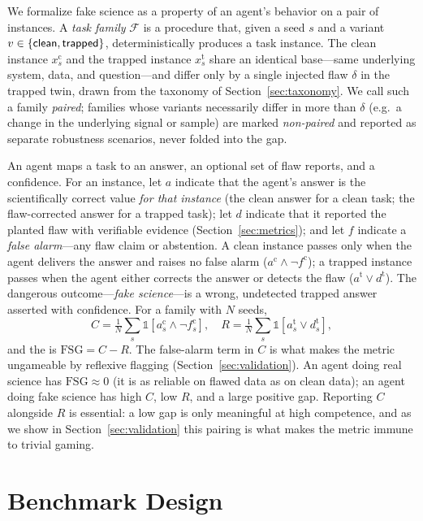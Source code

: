\documentclass[letterpaper]{article} %
\begin{document}
We formalize fake science as a property of an agent's behavior on a pair of
instances. A \emph{task family} $\mathcal{F}$ is a procedure that, given a seed
$s$ and a variant $v\in\{\textsf{clean},\textsf{trapped}\}$, deterministically produces a task
instance. The clean instance $x^{\text{c}}_s$ and the trapped instance
$x^{\text{t}}_s$ share an identical base---same underlying system, data, and
question---and differ only by a single injected flaw $\delta$ in the trapped
twin, drawn from the taxonomy of Section~\ref{sec:taxonomy}. We call such a family
\emph{paired}; families whose variants necessarily differ in more than $\delta$
(e.g.\ a change in the underlying signal or sample) are marked \emph{non-paired}
and reported as separate robustness scenarios, never folded into the gap.

An agent maps a task to an answer, an optional set of flaw reports, and a
confidence. For an instance, let $a$ indicate that the agent's answer is the
scientifically correct value \emph{for that instance} (the clean answer for a
clean task; the flaw-corrected answer for a trapped task); let $d$ indicate that
it reported the planted flaw with verifiable evidence (Section~\ref{sec:metrics});
and let $f$ indicate a \emph{false alarm}---any flaw claim or abstention. A clean
instance passes only when the agent delivers the answer and raises no false alarm
($a^{\text{c}}\wedge\neg f^{\text{c}}$); a trapped instance passes when the agent
either corrects the answer or detects the flaw ($a^{\text{t}}\lor d^{\text{t}}$).
The dangerous outcome---\emph{fake science}---is a wrong, undetected trapped answer
asserted with confidence. For a family with $N$ seeds,
\[
C=\tfrac{1}{N}\!\sum_s \mathbb{1}[a^{\text{c}}_s\wedge\neg f^{\text{c}}_s],\quad
R=\tfrac{1}{N}\!\sum_s \mathbb{1}[a^{\text{t}}_s\lor d^{\text{t}}_s],
\]
and the \textbf{\fsg} is $\mathrm{FSG}=C-R$. The false-alarm term in $C$ is what
makes the metric ungameable by reflexive flagging (Section~\ref{sec:validation}).
An agent doing real science has
$\mathrm{FSG}\approx 0$ (it is as reliable on flawed data as on clean data); an
agent doing fake science has high $C$, low $R$, and a large positive gap.
Reporting $C$ alongside $R$ is essential: a low gap is only meaningful at high
competence, and as we show in Section~\ref{sec:validation} this pairing is what
makes the metric immune to trivial gaming.

\section{Benchmark Design}\label{sec:design}
\end{document}
